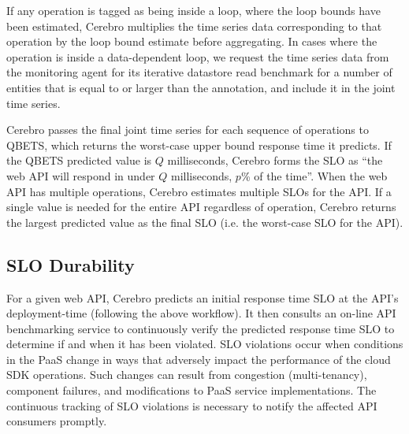 If any operation is tagged as being inside a loop, where the loop
bounds have been estimated, Cerebro multiplies
the time series data corresponding to that 
operation by the loop bound estimate before aggregating. In cases where the operation 
is inside a data-dependent loop, we request the time series data from 
the monitoring agent for its iterative datastore read benchmark 
for a number of entities that is equal to or larger than the annotation,
and include it in the joint time series.

Cerebro passes the final joint
time series for each sequence of operations to QBETS, 
which returns the worst-case upper bound response time it predicts.
If the QBETS predicted value is $Q$ milliseconds, 
Cerebro forms the SLO as ``the web API will respond in
under $Q$ milliseconds, $p$\% of the time''. 
When the web API has multiple operations, Cerebro estimates multiple 
SLOs for the API. 
If a single value is needed for the entire API regardless of operation,
Cerebro returns the largest 
predicted value as the final SLO (i.e. the worst-case SLO for the API).




\subsection{SLO Durability}
\label{sec:cerebro_sla_durability}
For a given web API, Cerebro predicts an initial response time SLO
at the API's deployment-time (following the above workflow). 
It then consults an on-line API benchmarking
service to continuously verify the predicted response time SLO
to determine if and when it has been violated.
SLO violations occur when conditions in the PaaS change in
ways that adversely impact the performance of the cloud SDK operations. 
Such changes can result
from congestion (multi-tenancy), component failures, and modifications to
PaaS service implementations. The continuous tracking of SLO violations is
necessary to notify the affected API consumers promptly.

